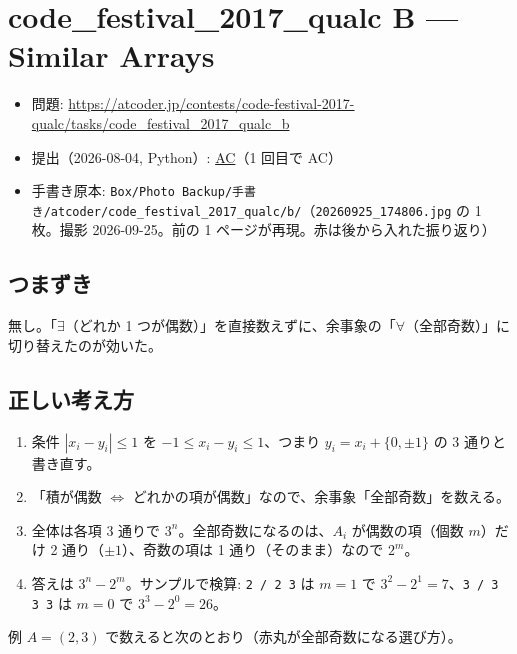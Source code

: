 \documentclass[a4paper]{article}
\begin{document}
\clearpage
\section*{code\_festival\_2017\_qualc B --- Similar Arrays}

\begin{itemize}
  \item 問題: \url{https://atcoder.jp/contests/code-festival-2017-qualc/tasks/code_festival_2017_qualc_b}
  \item 提出（2026-08-04, Python）:
    \href{https://atcoder.jp/contests/code-festival-2017-qualc/submissions/78112999}{AC}（1 回目で AC）
  \item 手書き原本: \texttt{Box/Photo Backup/手書き/atcoder/code\_festival\_2017\_qualc/b/}（\texttt{20260925\_174806.jpg} の 1 枚。撮影 2026-09-25。前の 1 ページが再現。赤は後から入れた振り返り）
\end{itemize}

\subsection*{つまずき}
無し。「$\exists$（どれか 1 つが偶数）」を直接数えずに、余事象の「$\forall$（全部奇数）」に切り替えたのが効いた。

\subsection*{正しい考え方}
\begin{enumerate}
  \item 条件 $|x_i - y_i| \leq 1$ を $-1 \leq x_i - y_i \leq 1$、つまり $y_i = x_i + \lbrace 0, \pm 1 \rbrace$ の 3 通りと書き直す。
  \item 「積が偶数 $\iff$ どれかの項が偶数」なので、余事象「全部奇数」を数える。
  \item 全体は各項 3 通りで $3^n$。全部奇数になるのは、$A_i$ が偶数の項（個数 $m$）だけ 2 通り（$\pm 1$）、奇数の項は 1 通り（そのまま）なので $2^m$。
  \item 答えは $3^n - 2^m$。サンプルで検算: \verb|2 / 2 3| は $m=1$ で $3^2 - 2^1 = 7$、\verb|3 / 3 3 3| は $m=0$ で $3^3 - 2^0 = 26$。
\end{enumerate}

例 $A = (2, 3)$ で数えると次のとおり（赤丸が全部奇数になる選び方）。
\end{document}
